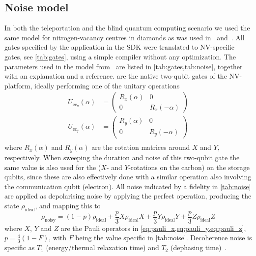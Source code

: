 \subsection{Noise model}
In both the teleportation and the blind quantum computing scenario we used the
same model for nitrogen-vacancy centres in diamonds as was used
in~\cite{dahlberg2019linklayer} and~\cite{coopmans2021netsquid}. All gates
specified by the application in the SDK were translated to NV-specific gates,
see \cref{tab:gates}, using a simple compiler without any optimization. The
parameters used in the model from~\cite{dahlberg2019linklayer} are listed in
\cref{tab:gates,tab:noise}, together with an explanation and a reference.
 are the native two-qubit gates of the NV-platform,
ideally performing one of the unitary operations
\begin{align}
  U_\mathrm{ec_x}(\alpha) & = \begin{pmatrix}R_x(\alpha) & 0 \\ 0 & R_x(-\alpha) \end{pmatrix} \label{eq:crot_x} \\
  U_\mathrm{ec_y}(\alpha) & = \begin{pmatrix}R_y(\alpha) & 0 \\ 0 & R_y(-\alpha) \end{pmatrix} \label{eq:crot_y} \\
\end{align}
where $R_x(\alpha)$ and $R_y(\alpha)$ are the rotation matrices around $X$ and
$Y$, respectively. When sweeping the duration and noise of this two-qubit gate
the same value is also used for the  ($X$- and $Y$-rotations
on the carbon) on the storage qubits, since these are also effectively done with
a similar operation also involving the communication qubit (electron). All noise
indicated by a fidelity in \cref{tab:noise} are applied as depolarising noise by
applying the perfect operation, producing the state $\rho_\mathrm{ideal}$, and
mapping this to
\begin{equation}\label{eq:depolarising}
  \rho_\mathrm{noisy}=(1-p)\rho_\mathrm{ideal} + \frac{p}{3}X\rho_\mathrm{ideal}X + \frac{p}{3}Y\rho_\mathrm{ideal}Y + \frac{p}{3}Z\rho_\mathrm{ideal}Z
\end{equation}
where $X$, $Y$ and $Z$ are the Pauli operators in
\cref{eq:pauli_x,eq:pauli_y,eq:pauli_z}, $p=\frac{4}{3}(1 - F)$, with $F$ being
the value specific in \cref{tab:noise}. Decoherence noise is specific as $T_1$
(energy/thermal relaxation time) and $T_2$ (dephasing time)~\cite{Nielsen2010}.

